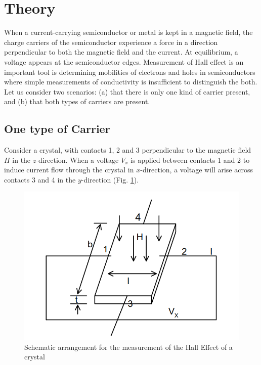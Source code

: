 \section{Theory}
When a current-carrying semiconductor or metal is kept in a magnetic field, the
charge carriers of the semiconductor experience a force in a direction
perpendicular to both the magnetic field and the current. At equilibrium, a voltage
appears at the semiconductor edges. Measurement of Hall effect is an important tool is determining mobilities of electrons and holes in semiconductors where simple measurements of conductivity is insufficient to distinguish the both. 
Let us consider two scenarios: (a) that there is only one kind of carrier present, and (b) that both types of carriers are present.

\subsection{One type of Carrier}

Consider a crystal, with contacts 1, 2 and 3 perpendicular to the magnetic field $H$ in the $z$-direction. When a voltage $V_x$ is applied between contacts 1 and 2 to induce current flow through the crystal in $x$-direction, a voltage will arise across contacts 3 and 4 in the $y$-direction (Fig. \ref{hall}). 

\begin{figure}
    \centering
    \includegraphics[width=0.7\columnwidth]{images/hall.png}
    \caption{Schematic arrangement for the measurement of the Hall Effect of a crystal}
    \label{hall}
\end{figure}

